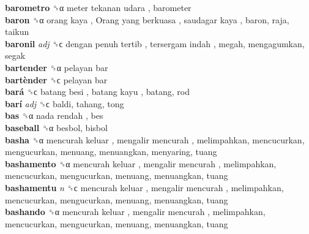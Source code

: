\textbf{barometro} ␝α   meter tekanan udara , barometer  \\
\textbf{baron} ␝α   orang kaya ,  Orang yang berkuasa ,  saudagar kaya , baron, raja, taikun  \\
\textbf{baronil} \emph{adj}  ␝ϲ   dengan penuh tertib ,  tersergam indah , megah, mengagumkan, segak  \\
\textbf{bartender} ␝α   pelayan bar   \\
\textbf{bartènder} ␝ϲ   pelayan bar   \\
\textbf{bará} ␝ϲ   batang besi ,  batang kayu , batang, rod  \\
\textbf{barí} \emph{adj}  ␝ϲ  baldi, tahang, tong  \\
\textbf{bas} ␝α   nada rendah , bes  \\
\textbf{baseball} ␝α  besbol, bisbol  \\
\textbf{basha} ␝α   mencurah keluar ,  mengalir mencurah , melimpahkan, mencucurkan, mengucurkan, menuang, menuangkan, menyaring, tuang  \\
\textbf{bashamento} ␝α   mencurah keluar ,  mengalir mencurah , melimpahkan, mencucurkan, mengucurkan, menuang, menuangkan, tuang  \\
\textbf{bashamentu} \emph{n}  ␝ϲ   mencurah keluar ,  mengalir mencurah , melimpahkan, mencucurkan, mengucurkan, menuang, menuangkan, tuang  \\
\textbf{bashando} ␝α   mencurah keluar ,  mengalir mencurah , melimpahkan, mencucurkan, mengucurkan, menuang, menuangkan, tuang  \\
